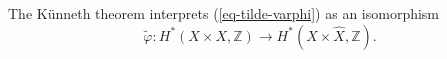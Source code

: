 \documentclass[12pt]{amsart}
\numberwithin{equation}{subsection}
\theoremstyle{plain}
\theoremstyle{definition}
\newtheorem{rem}[thm]{Remark}
\newcommand{\ZZ}{{\mathbb Z}}
\newcommand{\Spin}{{\rm Spin}}
\begin{document}
 The K\"{u}nneth theorem interprets (\ref{eq-tilde-varphi}) as an isomorphism 
\[
\tilde{\varphi}:H^*(X\times X,\ZZ)\rightarrow H^*(X\times\hat{X},\ZZ).
\]
 
\end{document}
